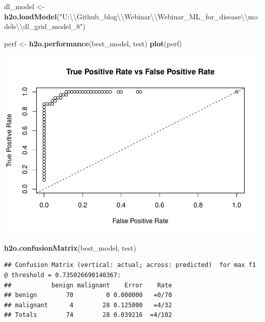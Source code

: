 \documentclass[]{article}
\newenvironment{Shaded}{\begin{snugshade}}{\end{snugshade}}
\newcommand{\KeywordTok}[1]{\textcolor[rgb]{0.13,0.29,0.53}{\textbf{{#1}}}}
\newcommand{\CharTok}[1]{\textcolor[rgb]{0.31,0.60,0.02}{{#1}}}
\newcommand{\StringTok}[1]{\textcolor[rgb]{0.31,0.60,0.02}{{#1}}}
\newcommand{\NormalTok}[1]{{#1}}
\begin{document}
\begin{Shaded}
\begin{Highlighting}[]
\NormalTok{dl_model <-}\StringTok{ }\KeywordTok{h2o.loadModel}\NormalTok{(}\StringTok{"U:}\CharTok{\textbackslash{}\textbackslash{}}\StringTok{Github_blog}\CharTok{\textbackslash{}\textbackslash{}}\StringTok{Webinar}\CharTok{\textbackslash{}\textbackslash{}}\StringTok{Webinar_ML_for_disease}\CharTok{\textbackslash{}\textbackslash{}}\StringTok{models}\CharTok{\textbackslash{}\textbackslash{}}\StringTok{dl_grid_model_8"}\NormalTok{)}
\end{Highlighting}
\end{Shaded}

\begin{Shaded}
\begin{Highlighting}[]
\NormalTok{perf <-}\StringTok{ }\KeywordTok{h2o.performance}\NormalTok{(best_model, test)}
\KeywordTok{plot}\NormalTok{(perf)}
\end{Highlighting}
\end{Shaded}

\includegraphics{webinar_code_files/figure-latex/unnamed-chunk-49-1.pdf}

\begin{Shaded}
\begin{Highlighting}[]
\KeywordTok{h2o.confusionMatrix}\NormalTok{(best_model, test)}
\end{Highlighting}
\end{Shaded}

\begin{verbatim}
## Confusion Matrix (vertical: actual; across: predicted)  for max f1 @ threshold = 0.735026690140367:
##           benign malignant    Error    Rate
## benign        70         0 0.000000   =0/70
## malignant      4        28 0.125000   =4/32
## Totals        74        28 0.039216  =4/102
\end{verbatim}
\end{document}
